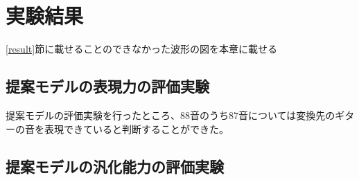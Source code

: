 
\section{実験結果}
\label{sec:appendix_result}

\ref{result}節に載せることのできなかった波形の図を本章に載せる

\subsection{提案モデルの表現力の評価実験}

提案モデルの評価実験を行ったところ、88音のうち87音については変換先のギターの音を表現できていると判断することができた。


\subsection{提案モデルの汎化能力の評価実験}